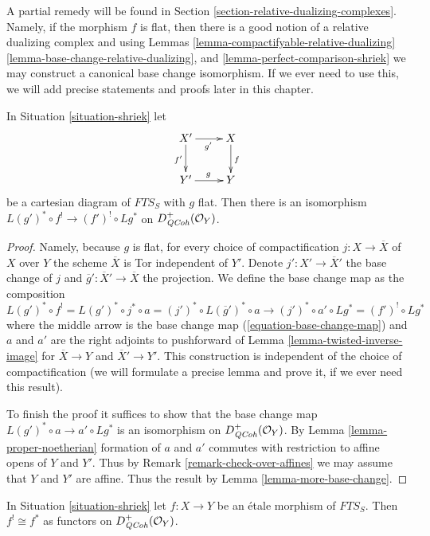 \medskip\noindent
A partial remedy will be found in
Section \ref{section-relative-dualizing-complexes}.
Namely, if the morphism $f$ is flat, then there is a good
notion of a relative dualizing complex and using
Lemmas \ref{lemma-compactifyable-relative-dualizing}
\ref{lemma-base-change-relative-dualizing},
and \ref{lemma-perfect-comparison-shriek}
we may construct a canonical base change isomorphism.
If we ever need to use this, we will add precise statements and
proofs later in this chapter.

\begin{lemma}
\label{lemma-base-change-shriek-flat}
In Situation \ref{situation-shriek} let
$$
\xymatrix{
X' \ar[r]_{g'} \ar[d]_{f'} & X \ar[d]^f \\
Y' \ar[r]^g & Y
}
$$
be a cartesian diagram of $\textit{FTS}_S$ with $g$ flat.
Then there is an isomorphism
$L(g')^* \circ f^! \to (f')^! \circ Lg^*$ on
$D_{\mathit{QCoh}}^+(\mathcal{O}_Y)$.
\end{lemma}

\begin{proof}
Namely, because $g$ is flat, for every choice of
compactification $j : X \to \overline{X}$ of $X$ over $Y$
the scheme $\overline{X}$ is Tor independent of $Y'$.
Denote $j' : X' \to \overline{X}'$ the
base change of $j$ and $\overline{g}' : \overline{X}' \to \overline{X}$
the projection. We define the base change map as the composition
$$
L(g')^* \circ f^! = L(g')^* \circ j^* \circ a =
(j')^* \circ L(\overline{g}')^* \circ a \longrightarrow
(j')^* \circ a' \circ Lg^* = (f')^! \circ Lg^*
$$
where the middle arrow is the base change map
(\ref{equation-base-change-map})
and $a$ and $a'$ are the right adjoints to pushforward
of Lemma \ref{lemma-twisted-inverse-image}
for $\overline{X} \to Y$ and $\overline{X}' \to Y'$.
This construction is independent of the choice of
compactification (we will formulate a precise lemma
and prove it, if we ever need this result).

\medskip\noindent
To finish the proof it suffices to show that the base change
map $L(g')^* \circ a \to a' \circ Lg^*$ is an isomorphism
on $D_{\mathit{QCoh}}^+(\mathcal{O}_Y)$.
By Lemma \ref{lemma-proper-noetherian} formation of $a$ and $a'$
commutes with restriction to affine opens of $Y$ and $Y'$.
Thus by Remark \ref{remark-check-over-affines}
we may assume that $Y$ and $Y'$ are affine.
Thus the result by Lemma \ref{lemma-more-base-change}.
\end{proof}

\begin{lemma}
\label{lemma-shriek-etale}
In Situation \ref{situation-shriek} let $f : X \to Y$ be an \'etale
morphism of $\textit{FTS}_S$. Then $f^! \cong f^*$ as functors on
$D^+_{\mathit{QCoh}}(\mathcal{O}_Y)$.
\end{lemma}

